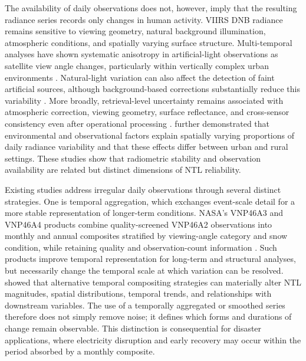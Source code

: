 \documentclass[]{interact}
\theoremstyle{plain}%
\theoremstyle{definition}
\theoremstyle{remark}
\begin{document}
    The availability of daily observations does not, however, imply that the resulting radiance series records only changes in human activity. VIIRS DNB radiance remains sensitive to viewing geometry, natural background illumination, atmospheric conditions, and spatially varying surface structure. Multi-temporal analyses have shown systematic anisotropy in artificial-light observations as satellite view angle changes, particularly within vertically complex urban environments \citep{Li2019_RSE_Anisotropy}. Natural-light variation can also affect the detection of faint artificial sources, although background-based corrections substantially reduce this variability \citep{Coesfeld2020_Sensors_NaturalLight}. More broadly, retrieval-level uncertainty remains associated with atmospheric correction, viewing geometry, surface reflectance, and cross-sensor consistency even after operational processing \citep{Wang2021_RSE_RetrievalUncertainty}. \citet{Tan2023_IJAEOG_SpatialUncertainty} further demonstrated that environmental and observational factors explain spatially varying proportions of daily radiance variability and that these effects differ between urban and rural settings. These studies show that radiometric stability and observation availability are related but distinct dimensions of NTL reliability.
    
    Existing studies address irregular daily observations through several distinct strategies. One is temporal aggregation, which exchanges event-scale detail for a more stable representation of longer-term conditions. NASA’s VNP46A3 and VNP46A4 products combine quality-screened VNP46A2 observations into monthly and annual composites stratified by viewing-angle category and snow condition, while retaining quality and observation-count information \citep{Wang2022_IEEE_MultiangleComposites}. Such products improve temporal representation for long-term and structural analyses, but necessarily change the temporal scale at which variation can be resolved. \citet{Zheng2022_RSE_TemporalCompositing} showed that alternative temporal compositing strategies can materially alter NTL magnitudes, spatial distributions, temporal trends, and relationships with downstream variables. The use of a temporally aggregated or smoothed series therefore does not simply remove noise; it defines which forms and durations of change remain observable. This distinction is consequential for disaster applications, where electricity disruption and early recovery may occur within the period absorbed by a monthly composite.
    
\end{document}
